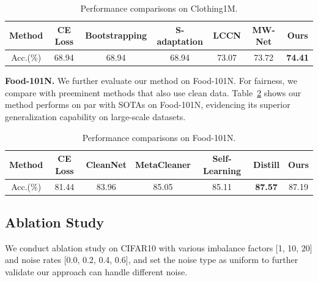 \documentclass[letterpaper]{article} %
\newcommand{\bd}[1]{\textbf{#1}}
\begin{document}
\begin{table}[h]
\centering
\begin{adjustbox}{max width=0.47\textwidth}
\begin{tabular}{c|cccccc}
\toprule
Method & CE Loss & Bootstrapping & S-adaptation & LCCN & MW-Net & Ours \\
\midrule
Acc.(\%)  & 68.94 & 68.94 & 68.94 & 73.07 & 73.72 & \bd{74.41} \\
\bottomrule
\end{tabular}%
\end{adjustbox}
\caption{Performance comparisons on Clothing1M.}
\label{tab:clothing}
\end{table}%

\noindent\bd{Food-101N.}
We further evaluate our method on Food-101N.
For fairness, we compare with preeminent methods that also use clean data. Table~\ref{tab:food101} shows our method performs on par with SOTAs on Food-101N, evidencing its superior generalization capability on large-scale datasets.
\begin{table}[h]
\centering
\begin{adjustbox}{max width=0.47\textwidth}
\begin{tabular}{c|cccccc}
\toprule
Method & CE Loss & CleanNet & MetaCleaner & Self-Learning & Distill & Ours \\
\midrule
Acc.(\%)  & 81.44 & 83.96 & 85.05 & 85.11 & \bd{87.57} & 87.19 \\
\bottomrule
\end{tabular}%
\end{adjustbox}
\caption{Performance comparisons on Food-101N.}
\label{tab:food101}%
\end{table}%

\subsection{Ablation Study}

We conduct ablation study on CIFAR10 with various imbalance factors [1, 10, 20] and noise rates [0.0, 0.2, 0.4, 0.6], and set the noise type as uniform to further validate our approach can handle different noise.
\end{document}
